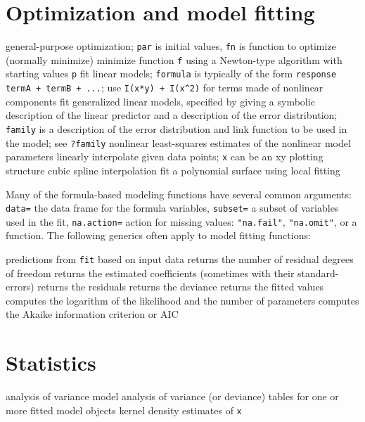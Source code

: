 \section{Optimization and model fitting}{}

	{general-purpose optimization; {\tt par} is initial values, {\tt fn} is function to optimize (normally minimize)}
	{minimize function {\tt f} using a Newton-type algorithm with starting values {\tt p}}
	{fit linear models; {\tt formula} is typically of the form {\tt response ~ termA + termB + ...}; use {\tt I(x*y) + I(x\^{}2)} for terms made of nonlinear components}
	{fit generalized linear models, specified by giving a symbolic description of the linear predictor and a description of the error distribution; {\tt family} is a description of the error distribution and link function to be used in the model; see {\tt ?family}}
	{nonlinear least-squares estimates of the nonlinear model parameters}
	{linearly interpolate given data points; {\tt x} can be an xy plotting structure}
	{cubic spline interpolation}
	{fit a polynomial surface using local fitting}

Many of the formula-based modeling functions have several common
arguments: {\tt data=} the data frame for the formula variables,
{\tt subset=} a subset of variables used in the fit,
{\tt na.action=} action for missing values: {\tt "na.fail"}, {\tt "na.omit"}, or
a function. The following generics often apply to model fitting functions:


	{predictions from {\tt fit} based on input data}
	{ returns the number of residual degrees of freedom}
	{ returns the estimated coefficients (sometimes with their standard-errors)}
	{ returns the residuals}
	{ returns the deviance}
	{ returns the fitted values}
	{ computes the logarithm of the likelihood and the number of parameters}
	{ computes the Akaike information criterion or AIC}

\section{Statistics}{}

	{analysis of variance model}
	{analysis of variance (or deviance) tables for one or more fitted model objects}
	{kernel density estimates of {\tt x}}

